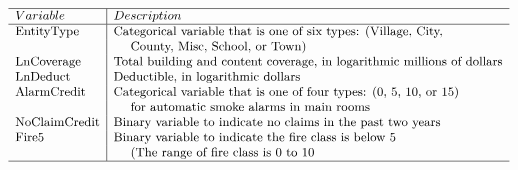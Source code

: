 \documentclass[]{book}
\theoremstyle{definition}
\theoremstyle{definition}
\theoremstyle{definition}
\theoremstyle{remark}
\begin{document}
\[{\small \begin{matrix}
\begin{array}{ l | l}
\hline
Variable    & Description \\
\hline
\text{EntityType}   & \text{Categorical variable that is one of six types:  (Village, City,} \\
& ~~~~ \text{County, Misc, School, or Town)} \\
\text{LnCoverage}   & \text{Total building and content coverage, in logarithmic millions of dollars}\\
\text{LnDeduct}     & \text{Deductible, in logarithmic dollars} \\
\text{AlarmCredit}  & \text{Categorical variable that is one of four types:  (0, 5, 10, or 15)} \\
 &  ~~~~   \text{for automatic smoke alarms in main rooms} \\
\text{NoClaimCredit}    & \text{Binary variable to indicate no claims in the past two years} \\
\text{Fire5 }           & \text{Binary variable to indicate the fire class is below 5} \\
& ~~~~ \text{(The range of fire class is 0 to 10} \\
\hline
\end{array}
\end{matrix}}\]
\end{document}
